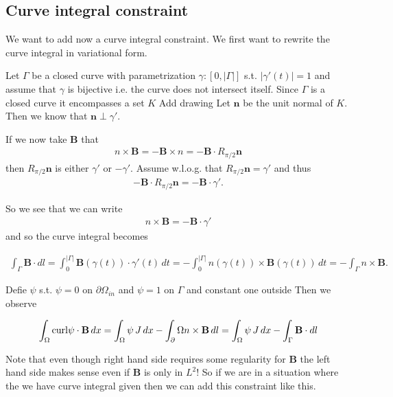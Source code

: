 \documentclass[../master_thesis.tex]{subfiles}
\begin{document}
\subsection{Curve integral constraint}

We want to add now a curve integral constraint. We first want to rewrite the curve 
integral in variational form. 

Let $\Gamma$ be a closed curve with parametrization $\gamma:[0,|\Gamma|]$ s.t. 
$|\gamma'(t)| = 1$ and assume that $\gamma$ is bijective i.e. the curve does not 
intersect itself. Since $\Gamma$ is a closed curve 
it encompasses a set $K$ {\color{red} Add drawing} Let $\mathbf{n}$ be the 
unit normal of $K$. Then we know that $\mathbf{n} \perp \gamma'$. 

If we now take $\mathbf{B}$ that 
\begin{align*}
    n \times \mathbf{B} =   -\mathbf{B}\times n = -\mathbf{B} \cdot R_{\pi/2} \mathbf{n}
\end{align*}
then $R_{\pi/2} \mathbf{n}$ is either $\gamma'$ or $-\gamma'$. Assume w.l.o.g.
that $R_{\pi/2} \mathbf{n} = \gamma'$ and thus 
\begin{align*}
    -\mathbf{B} \cdot R_{\pi/2} \mathbf{n} = - \mathbf{B} \cdot \gamma'.
\end{align*}

So we see that we can write 
\begin{align*}
    n \times \mathbf{B} = - \mathbf{B} \cdot \gamma'
\end{align*}
and so the curve integral becomes

\begin{align*}
    \int_\Gamma \mathbf{B}\cdot dl= \int_0^{|\Gamma|} \mathbf{B}(\gamma(t)) \cdot \gamma'(t) \, dt 
    = - \int_0^{|\Gamma|} n(\gamma(t)) \times \mathbf{B}(\gamma(t)) \, dt 
    = - \int_\Gamma n \times \mathbf{B}.
\end{align*}

Defie $\psi$ s.t. $\psi = 0$ on $\partial \Omega_{in}$ and $\psi = 1$ on $\Gamma$ 
and constant one outside
Then we observe 

\begin{align*}
    \int_\Omega \mathbf{\operatorname{curl}} \psi \cdot \mathbf{B} \, dx = 
    \int_\Omega \psi \, J \, dx - \int_\partial\Omega n\times \mathbf{B} \, dl
    = \int_\Omega \psi \, J \, dx - \int_\Gamma \mathbf{B}\cdot dl
\end{align*}

Note that even though right hand side requires some regularity for $\mathbf{B}$
the left hand side makes sense even if $\mathbf{B}$ is only in $L^2$!
So if we are in a situation where the we have curve integral given then 
we can add this constraint like this. 
\end{document}
